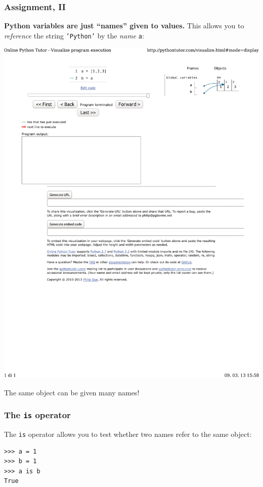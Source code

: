 \documentclass[english,serif,mathserif,xcolor=pdftex,dvipsnames,table]{beamer}
\begin{document}
\begin{frame}[fragile]
  \frametitle{Assignment, II}

  \textbf{Python variables are just ``names'' given to values.}
  This allows you to \emph{reference} the string \texttt{'Python'}
  by the \emph{name} \texttt{a}:

  \+
  \includegraphics[width=1.2\linewidth,viewport=150 650 650 750,clip]{fig/a_is_b}

  \+
  The same object can be given many names!
\end{frame}


\begin{frame}[fragile]
  \frametitle{The \texttt{is} operator}

  The \texttt{is} operator allows you to test whether two names refer
  to the same object:
\begin{lstlisting}
>>> a = 1
>>> b = 1
>>> a is b
True
\end{lstlisting}

\end{frame}
\end{document}
